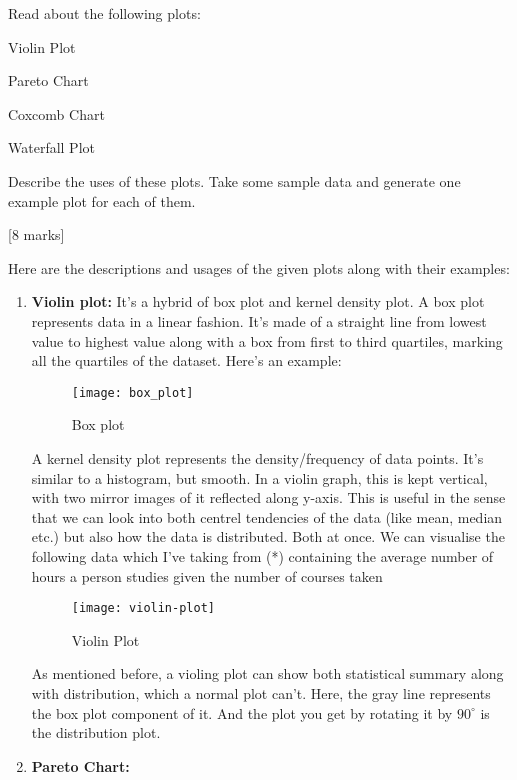 \begin{que}
	Read about the following plots:
	\begin{enumerate}
		{\color{red}
		\item Violin Plot
		\item Pareto Chart
		\item Coxcomb Chart
		\item Waterfall Plot
		      }
	\end{enumerate}
	Describe the uses of these plots. Take some sample data and generate one example plot
	for each of them.

	\hspace*{\fill} [8 marks]
\end{que}

\begin{tcolorbox}[breakable]
	\begin{sol}
		Here are the descriptions and usages of the given plots along with their examples:
		\begin{enumerate}
			\item \textbf{Violin plot:} It's a hybrid of box plot and kernel density plot.
			      A box plot represents data in a linear fashion. It's made of a straight line
			      from lowest value to highest value along with a box from first to third
			      quartiles, marking all the quartiles of the dataset. Here's an example:
			      \begin{figure}[H]
				      \centering
				      \texttt{[image: box\_plot]}
				      \caption{Box plot}
				      \label{fig:box}
			      \end{figure}
			      A kernel density plot represents the density/frequency of data points. It's
			      similar to a histogram, but smooth. In a violin graph, this is kept vertical,
			      with two mirror images of it reflected along y-axis. This is useful in the
			      sense that we can look into both centrel tendencies of the data (like mean,
			      median etc.) but also how the data is distributed. Both at once. We can
			      visualise the following data which I've taking from (*) containing the average
			      number of hours a person studies given the number of courses taken
			      \begin{figure}[H]
				      \centering
				      \texttt{[image: violin-plot]}
				      \caption{Violin Plot}
				      \label{fig:violin}
			      \end{figure}
			      As mentioned before, a violing plot can show both statistical summary along
			      with distribution, which a normal plot can't. Here, the gray line represents
			      the box plot component of it. And the plot you get by rotating it by $90^\circ$
			      is the distribution plot.
			  \item \textbf{Pareto Chart:} 
		\end{enumerate}
	\end{sol}
\end{tcolorbox}
